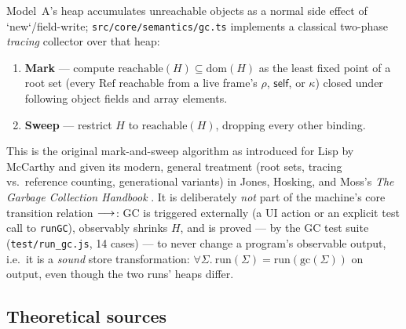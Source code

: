 \documentclass[11pt]{article}
\newcommand{\rulename}[1]{\textsc{#1}}
\newcommand{\Step}[1]{\longrightarrow_{\rulename{#1}}}
\newcommand{\dom}{\mathrm{dom}}
\begin{document}
Model~A's heap accumulates unreachable objects as a normal side effect of
`new`/field-write; \texttt{src/core/semantics/gc.ts} implements a classical
two-phase \emph{tracing} collector over that heap:

\begin{enumerate}
  \item \textbf{Mark} --- compute $\mathrm{reachable}(H) \subseteq \dom(H)$
        as the least fixed point of a root set (every $\mathrm{Ref}$
        reachable from a live frame's $\rho$, $\mathsf{self}$, or $\kappa$)
        closed under following object fields and array elements.
  \item \textbf{Sweep} --- restrict $H$ to $\mathrm{reachable}(H)$, dropping
        every other binding.
\end{enumerate}
This is the original mark-and-sweep algorithm as introduced for Lisp by
McCarthy \cite{mccarthy1960recursive} and given its modern, general
treatment (root sets, tracing vs.\ reference counting, generational
variants) in Jones, Hosking, and Moss's \emph{The Garbage Collection
Handbook} \cite{jgh2011gchandbook}. It is deliberately \emph{not} part of
the machine's core transition relation $\Step{}$: GC is triggered
externally (a UI action or an explicit test call to \texttt{runGC}),
observably shrinks $H$, and is proved --- by the GC test suite
(\texttt{test/run\_gc.js}, 14 cases) --- to never change a program's
observable output, i.e.\ it is a \emph{sound} store transformation:
$\forall \Sigma.\ \mathrm{run}(\Sigma) = \mathrm{run}(\mathrm{gc}(\Sigma))$
on output, even though the two runs' heaps differ.

\subsection{Theoretical sources}
\end{document}
